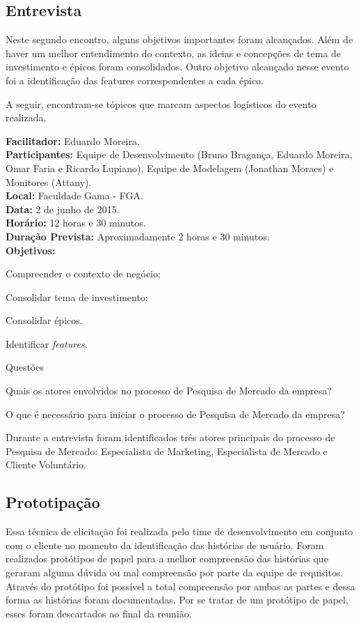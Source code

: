 	\subsection{Entrevista}

		Neste segundo encontro, alguns objetivos importantes foram alcançados. Além de haver um melhor entendimento do contexto, as ideias e concepções de tema de investimento e épicos foram consolidados. Outro objetivo alcançado nesse evento foi a identificação das features correspondentes a cada épico.
		
		A seguir, encontram-se tópicos que marcam aspectos logísticos do evento realizada.

		\noindent
		\textbf{Facilitador: }Eduardo Moreira.\\
		\textbf{Participantes: }Equipe de Desenvolvimento (Bruno Bragança, Eduardo Moreira, Omar Faria e Ricardo Lupiano), Equipe de Modelagem (Jonathan Moraes) e Monitores (Attany).\\
		\textbf{Local: }Faculdade Gama - FGA.\\
		\textbf{Data: }2 de junho de 2015.\\
		\textbf{Horário: }12 horas e 30 minutos.\\
		\textbf{Duração Prevista: }Aproximadamente 2 horas e 30 minutos.\\
		\textbf{Objetivos:}\\
		\begin{itemize}
		{
			\item Compreender o contexto de negócio;
			\item Consolidar tema de investimento;
			\item Consolidar épicos.
			\item Identificar \textit{features}.
		}
		\end{itemize}

		\noindent
		Questões
		\begin{itemize}
		{
			\item Quais os atores envolvidos no processo de Pesquisa de Mercado da empresa?
			\item O que é necessário para iniciar o processo de Pesquisa de Mercado da empresa?
		}
		\end{itemize}

		Durante a entrevista foram identificados três atores principais do processo de Pesquisa de Mercado: Especialista de Marketing, Especialista de Mercado e Cliente Voluntário.

	\subsection{Prototipação}

		Essa técnica de elicitação foi realizada pelo time de desenvolvimento em conjunto com o cliente no momento da identificação das histórias de usuário. Foram realizados protótipos de papel para a melhor compreensão das histórias que geraram alguma dúvida ou mal compreensão por parte da equipe de requisitos. Através do protótipo foi possível a total compreensão por ambas as partes e dessa forma as histórias foram documentadas. Por se tratar de um protótipo de papel, esses foram descartados ao final da reunião.
